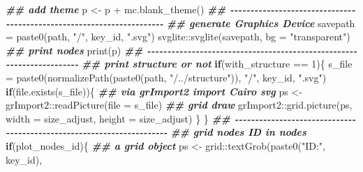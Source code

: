 \documentclass[
]{article}
\newenvironment{Shaded}{\begin{snugshade}}{\end{snugshade}}
\newcommand{\AttributeTok}[1]{\textcolor[rgb]{0.77,0.63,0.00}{#1}}
\newcommand{\ControlFlowTok}[1]{\textcolor[rgb]{0.13,0.29,0.53}{\textbf{#1}}}
\newcommand{\DecValTok}[1]{\textcolor[rgb]{0.00,0.00,0.81}{#1}}
\newcommand{\DocumentationTok}[1]{\textcolor[rgb]{0.56,0.35,0.01}{\textbf{\textit{#1}}}}
\newcommand{\FunctionTok}[1]{\textcolor[rgb]{0.00,0.00,0.00}{#1}}
\newcommand{\NormalTok}[1]{#1}
\newcommand{\OtherTok}[1]{\textcolor[rgb]{0.56,0.35,0.01}{#1}}
\newcommand{\SpecialCharTok}[1]{\textcolor[rgb]{0.00,0.00,0.00}{#1}}
\newcommand{\StringTok}[1]{\textcolor[rgb]{0.31,0.60,0.02}{#1}}
\begin{document}
\begin{Shaded}
\begin{Highlighting}[]
    \DocumentationTok{\#\# add theme}
\NormalTok{    p }\OtherTok{\textless{}{-}}\NormalTok{ p }\SpecialCharTok{+} \FunctionTok{mc.blank\_theme}\NormalTok{()}
    \DocumentationTok{\#\# {-}{-}{-}{-}{-}{-}{-}{-}{-}{-}{-}{-}{-}{-}{-}{-}{-}{-}{-}{-}{-}{-}{-}{-}{-}{-}{-}{-}{-}{-}{-}{-}{-}{-}{-}{-}{-}{-}{-}{-}{-}{-}{-}{-}{-}{-}{-}{-}{-}{-}{-}{-}{-}{-}{-}{-}{-}{-}{-}{-}{-}{-}{-}{-}{-}{-}{-}{-}{-}{-} }
    \DocumentationTok{\#\# generate Graphics Device}
\NormalTok{    savepath }\OtherTok{=} \FunctionTok{paste0}\NormalTok{(path, }\StringTok{"/"}\NormalTok{, key\_id, }\StringTok{".svg"}\NormalTok{)}
\NormalTok{    svglite}\SpecialCharTok{::}\FunctionTok{svglite}\NormalTok{(savepath, }\AttributeTok{bg =} \StringTok{"transparent"}\NormalTok{)}
    \DocumentationTok{\#\# print nodes }
    \FunctionTok{print}\NormalTok{(p)}
    \DocumentationTok{\#\# {-}{-}{-}{-}{-}{-}{-}{-}{-}{-}{-}{-}{-}{-}{-}{-}{-}{-}{-}{-}{-}{-}{-}{-}{-}{-}{-}{-}{-}{-}{-}{-}{-}{-}{-}{-}{-}{-}{-}{-}{-}{-}{-}{-}{-}{-}{-}{-}{-}{-}{-}{-}{-}{-}{-}{-}{-}{-}{-}{-}{-}{-}{-}{-}{-}{-}{-}{-}{-}{-} }
    \DocumentationTok{\#\# print structure or not}
    \ControlFlowTok{if}\NormalTok{(with\_structure }\SpecialCharTok{==} \DecValTok{1}\NormalTok{)\{}
\NormalTok{      s\_file }\OtherTok{=} \FunctionTok{paste0}\NormalTok{(}\FunctionTok{normalizePath}\NormalTok{(}\FunctionTok{paste0}\NormalTok{(path, }\StringTok{"/../structure"}\NormalTok{)), }\StringTok{"/"}\NormalTok{, key\_id, }\StringTok{".svg"}\NormalTok{)}
      \ControlFlowTok{if}\NormalTok{(}\FunctionTok{file.exists}\NormalTok{(s\_file))\{}
        \DocumentationTok{\#\# via grImport2 import Cairo svg}
\NormalTok{        ps }\OtherTok{\textless{}{-}}\NormalTok{ grImport2}\SpecialCharTok{::}\FunctionTok{readPicture}\NormalTok{(}\AttributeTok{file =}\NormalTok{ s\_file)}
        \DocumentationTok{\#\# grid draw}
\NormalTok{        grImport2}\SpecialCharTok{::}\FunctionTok{grid.picture}\NormalTok{(ps, }\AttributeTok{width =}\NormalTok{ size\_adjust, }\AttributeTok{height =}\NormalTok{ size\_adjust)}
\NormalTok{      \}}
\NormalTok{    \}}
    \DocumentationTok{\#\# {-}{-}{-}{-}{-}{-}{-}{-}{-}{-}{-}{-}{-}{-}{-}{-}{-}{-}{-}{-}{-}{-}{-}{-}{-}{-}{-}{-}{-}{-}{-}{-}{-}{-}{-}{-}{-}{-}{-}{-}{-}{-}{-}{-}{-}{-}{-}{-}{-}{-}{-}{-}{-}{-}{-}{-}{-}{-}{-}{-}{-}{-}{-}{-}{-}{-}{-}{-}{-}{-} }
    \DocumentationTok{\#\# grid nodes ID in nodes }
    \ControlFlowTok{if}\NormalTok{(plot\_nodes\_id)\{}
      \DocumentationTok{\#\# a grid object}
\NormalTok{      ps }\OtherTok{\textless{}{-}}\NormalTok{ grid}\SpecialCharTok{::}\FunctionTok{textGrob}\NormalTok{(}\FunctionTok{paste0}\NormalTok{(}\StringTok{"ID:"}\NormalTok{, key\_id),}

\end{Highlighting}
\end{Shaded}
\end{document}
